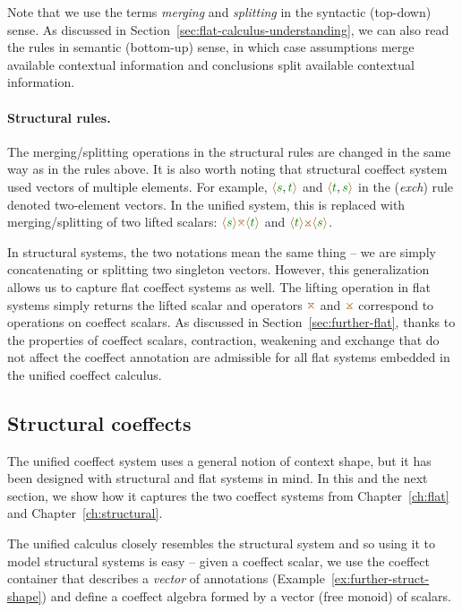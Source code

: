 Note that we use the terms \emph{merging} and \emph{splitting} in the syntactic (top-down) sense. As
discussed in Section~\ref{sec:flat-calculus-understanding}, we can also read
the rules in semantic (bottom-up) sense, in which case assumptions merge available contextual
information and conclusions split available contextual information.

\paragraph{Structural rules.}
The merging/splitting operations in the structural rules are changed in the same way as in the
rules above. It is also worth noting that structural coeffect system used vectors of multiple
elements. For example, $\alift{\cclrd{s},\cclrd{t}}$ and $\alift{\cclrd{t},\cclrd{s}}$ in the (\emph{exch})
rule denoted two-element vectors. In the unified system, this is replaced with merging/splitting
of two lifted scalars: $\alift{\cclrd{s}} \azip \alift{\cclrd{t}}$ and $\alift{\cclrd{t}} \apar \alift{\cclrd{s}}$.

In structural systems, the two notations mean the same thing -- we are simply concatenating or splitting two
singleton vectors. However, this generalization allows us to capture flat coeffect systems as well.
The lifting operation in flat systems simply returns the lifted scalar and operators $\azip$ and
$\apar$ correspond to operations on coeffect scalars. As discussed in Section~\ref{sec:further-flat},
thanks to the properties of coeffect scalars, contraction, weakening and exchange that do not
affect the coeffect annotation are admissible for all flat systems embedded in the unified
coeffect calculus.


\subsection{Structural coeffects}
\label{sec:further-structural}

The unified coeffect system uses a general notion of context shape, but it has been designed with
structural and flat systems in mind. In this and the next section, we show how it captures
the two coeffect systems from Chapter~\ref{ch:flat} and Chapter~\ref{ch:structural}.

The unified calculus closely resembles the structural system and so using it to model structural
systems is easy -- given a coeffect scalar, we use the coeffect container that describes a \emph{vector}
of annotations (Example~\ref{ex:further-struct-shape}) and define a coeffect algebra formed by
a vector (free monoid) of scalars.

